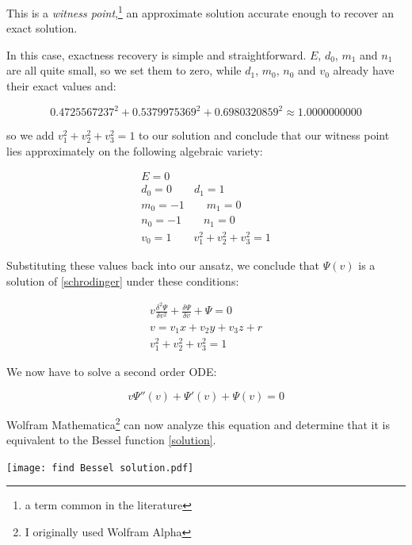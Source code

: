 \documentclass{article}
\begin{document}
This is a {\it witness point},\footnote{a term common in the literature} an approximate solution accurate enough
to recover an exact solution.

In this case, exactness recovery is simple and straightforward.  $E$, $d_0$, $m_1$ and $n_1$ are all quite small,
so we set them to zero, while $d_1$, $m_0$, $n_0$ and $v_0$ already have their exact values and:

\begin{equation*}
0.4725567237^2 + 0.5379975369^2 + 0.6980320859^2 \approx  1.0000000000
\end{equation*}

so we add $v_1^2 + v_2^2 + v_3^2 = 1$ to our solution and conclude that our witness point lies approximately
on the following algebraic variety:

\begin{equation}
\begin{gathered}
E = 0 \\
d_0 = 0 \qquad
d_1 = 1 \\
m_0 = -1 \qquad
m_1 = 0 \\
n_0 = -1 \qquad
n_1 = 0 \\
v_0 = 1 \qquad
v_1^2 + v_2^2 + v_3^2 = 1
\end{gathered}
\end{equation}

Substituting these values back into our ansatz, we conclude that $\Psi(v)$
is a solution of \eqref{schrodinger} under these conditions:

\begin{equation}
\label{related solution}
\begin{gathered}
v \frac{\delta^2\Psi}{\delta v^2} + \frac{\delta\Psi}{\delta v} + \Psi = 0 \\
v = v_1 x+ v_2 y+ v_3 z+r \\
v_1^2 + v_2^2 + v_3^2 = 1
\end{gathered}
\end{equation}

We now have to solve a second order ODE:

\begin{equation}
v \Psi''(v) + \Psi'(v) + \Psi(v) = 0
\end{equation}

Wolfram Mathematica\footnote{I originally used Wolfram Alpha} can now
analyze this equation and determine that it is equivalent
to the Bessel function \eqref{solution}.

\texttt{[image: find Bessel solution.pdf]}
\end{document}
